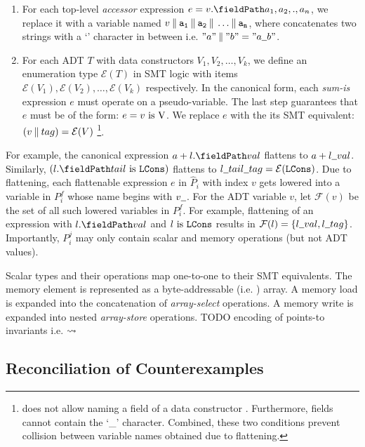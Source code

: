 \begin{enumerate}
\item For each top-level {\em accessor} expression $e = \prodAccess{v}{a_1,a_2,.,a_n}$, we replace it with a
variable named $v \mathbin\Vert{} {{\tt a_1}} \mathbin\Vert{} {{\tt a_2}} \mathbin\Vert{} \dots \mathbin\Vert{} {{\tt a_n}}$,
where \strcat{} concatenates two strings with a `\strsep{}' character in between i.e.
$"a" \strcat{} "b" = "a \strsep{} b"$.

\item For each ADT $T$ with data constructors $V_1,V_2,\dots,V_k$,
we define an enumeration type $\mathcal{E}(T)$ in SMT logic with items
$\mathcal{E}(V_1),\mathcal{E}(V_2),\dots,\mathcal{E}(V_k)$ respectively.
In the canonical form, each {\em sum-is} expression $e$ must operate on a pseudo-variable.
The last step guarantees that $e$ must be of the form: $e = v\ \mathrm{is}\ {\tt \textnormal{V}}$.
We replace $e$ with the its SMT equivalent: $(v \mathbin\Vert{} tag) = \mathcal{E}(V)$
\footnote{\SpecL{} does not allow naming a field of a data constructor .
Furthermore, fields cannot contain the `\_' character.
Combined, these two conditions prevent collision between variable names obtained due to flattening.}.
\end{enumerate}

For example, the canonical expression $a + \prodAccess{l}{val}$ flattens to $a + l \strsep{} val$.
Similarly, $(\sumIs{\prodAccess{l}{tail}}{LCons})$ flattens to $l \strsep{} tail \strsep{} tag = \mathcal{E}(\cons{LCons})$.
Due to flattening, each flattenable expression $e$ in $\hat{P}_i$ with index $v$ gets lowered
into a variable in $P_i^f$ whose name begins with $v \strsep$.
For the ADT variable $v$, let $\mathcal{F}(v)$ be the set of all such lowered variables in $P_i^f$.
For example, flattening of an expression with $\prodAccess{l}{val}$ and $l\ \mathrm{is}\ {\tt LCons}$
results in $\mathcal{F}(l) = \{ l \strsep{} val, l \strsep tag \}$.
Importantly, $P_i^j$ may only contain scalar and memory operations (but not ADT values).

Scalar types and their operations map one-to-one to their SMT equivalents.
The memory element \mem{} is represented as a byte-addressable (i.e. ) array.
A memory load  is expanded into the concatenation of  {\em array-select} operations.
A memory write  is expanded into  nested {\em array-store} operations.
TODO encoding of points-to invariants i.e. $\rightsquigarrow$

\subsection{Reconciliation of Counterexamples}
\label{sec:cerecons}

